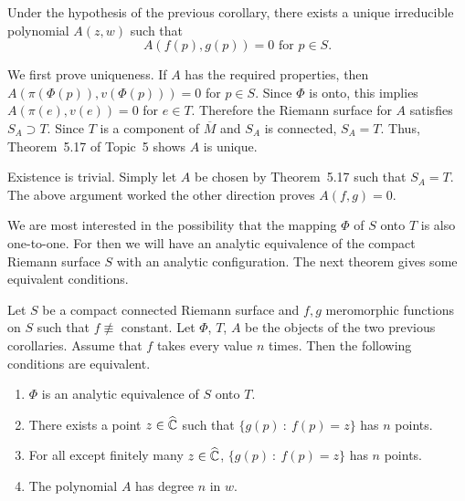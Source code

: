 \documentclass[a4paper,11pt]{article}
\begin{document}
\begin{cor}
  Under the hypothesis of the previous corollary, there exists a
  unique irreducible polynomial $A(z,w)$ such that
  $$
  A(f(p), g(p)) = 0\text{ for } p \in S.
  $$
\end{cor}

\begin{myproof}
  We first prove uniqueness.  If $A$ has the required properties, then
  $A(\pi(\Phi(p)), v(\Phi(p))) = 0$ for $p \in S$.  Since $\Phi$ is
  onto, this implies $A(\pi(e), v(e)) = 0$ for $e \in T$.  Therefore
  the Riemann surface for $A$ satisfies $S_A \supset T$.  Since $T$ is
  a component of $\overline{M}$ and $S_A$ is connected, $S_A = T$.
  Thus, Theorem~5.17 of Topic~5 shows $A$ is unique.

  Existence is trivial.  Simply let $A$ be chosen by Theorem~5.17
  such that $S_A = T$.  The above argument worked the other direction 
  proves $A(f,g) = 0$.
\end{myproof}

We are most interested in the possibility that the mapping $\Phi$ of
$S$ onto $T$ is also one-to-one.  For then we will have an analytic
equivalence of the compact Riemann surface $S$ with an analytic
configuration.  The next theorem gives some equivalent conditions.

\begin{thm}
  \label{thm:2}
  Let $S$ be a compact connected Riemann surface and $f, g$
  meromorphic functions on $S$ such that $f \not\equiv$ constant.  Let
  $\Phi$, $T$, $A$ be the objects of the two previous corollaries.
  Assume that $f$ takes every value $n$ times.  Then the following
  conditions are equivalent.
  \begin{enumerate}
  \item $\Phi$ is an analytic equivalence of $S$ onto $T$.
  \item There exists a point $z \in \widehat{{\mathbb C}}$ such that $\{g(p)
    ~:~ f(p) = z \}$ has $n$ points.
  \item For all except finitely many $z \in \widehat{{\mathbb C}}$, $\{ g(p)
    ~:~ f(p) = z\}$ has $n$ points.
  \item The polynomial $A$ has degree $n$ in $w$.
  \end{enumerate}
\end{thm}
\end{document}
